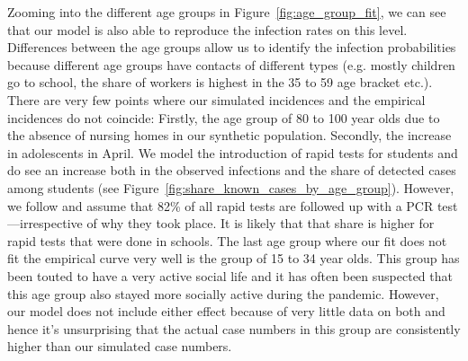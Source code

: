 Zooming into the different age groups in Figure~\ref{fig:age_group_fit}, we can see that
our model is also able to reproduce the infection rates on this level. Differences
between the age groups allow us to identify the infection probabilities because different
age groups have contacts of different types (e.g. mostly children go to school, the share
of workers is highest in the 35 to 59 age bracket etc.). There are very few points where
our simulated incidences and the empirical incidences do not
coincide: Firstly,
the age group of 80 to 100 year olds due to the absence of nursing homes in our synthetic
population. Secondly, the increase in adolescents in April. We model the introduction of
rapid tests for students and do see an increase both in the observed infections and the
share of detected cases among students (see
Figure~\ref{fig:share_known_cases_by_age_group}). However, we follow \cite{Betsch2021}
and assume that 82\% of all rapid tests are followed up with a PCR test---irrespective of
why they took place. It is likely that that share is higher for rapid tests that were
done in schools. The last age group where our fit does not fit the empirical curve very
well is the group of 15 to 34 year olds. This group has been touted to have a very active
social life and it has often been suspected that this age group also stayed more socially
active during the pandemic. However, our model does not include either effect because of
very little data on both and hence it's unsurprising that the actual case numbers in this
group are consistently higher than our simulated case numbers.


